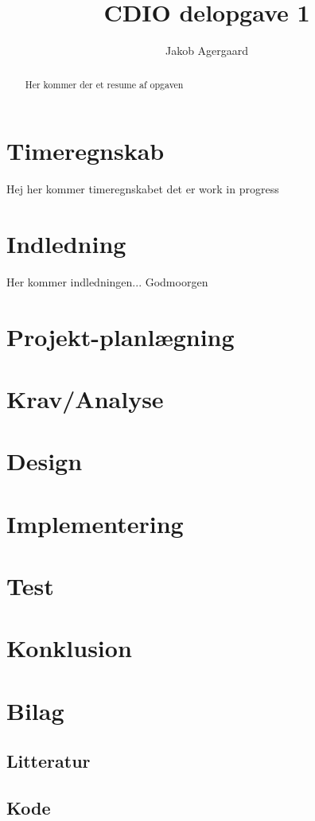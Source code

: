 \documentclass{article}
\title{CDIO delopgave 1}
\author{Jakob Agergaard}
\begin{document}


\normalsize
\begin{abstract}
     Her kommer der et resume af opgaven
\end{abstract}

\tableofcontents

\section{Timeregnskab}
Hej her kommer timeregnskabet det er work in progress

\section{Indledning}

Her kommer indledningen...
Godmoorgen

\section{Projekt-planlægning}

\section{Krav/Analyse}

\section{Design}

\section{Implementering}

\section{Test}

\section{Konklusion}

\section{Bilag}
\subsection{Litteratur}
\subsection{Kode}
\end{document}
